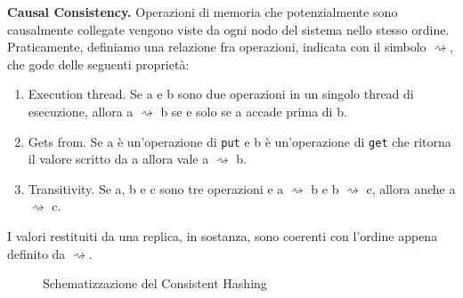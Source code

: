 \documentclass[twoside]{article}
\begin{document}
\begin{multicols}{2}
\textbf{Causal Consistency.} Operazioni di memoria che potenzialmente sono causalmente collegate vengono viste da ogni nodo del sistema nello stesso ordine. Praticamente, definiamo una relazione fra operazioni, indicata con il simbolo $\rightsquigarrow$, che gode delle seguenti proprietà:
\begin{enumerate}[topsep=0pt,itemsep=-1ex,partopsep=1ex,parsep=1ex]
\item Execution thread. Se a e b sono due operazioni in un singolo thread di esecuzione, allora a $\rightsquigarrow$ b se e solo se a accade prima di b.
\item Gets from. Se a è un'operazione di \texttt{put} e b è un'operazione di \texttt{get} che ritorna il valore scritto da a allora vale a $\rightsquigarrow$ b.
\item Transitivity. Se a, b e c sono tre operazioni e a $\rightsquigarrow$ b e b $\rightsquigarrow$ c, allora anche a $\rightsquigarrow$ c.
\end{enumerate}
I valori restituiti da una replica, in sostanza, sono coerenti con l'ordine appena definito da $\rightsquigarrow$.
\begin{figure}[H]
\centering
{}
\caption{Schematizzazione del Consistent Hashing}
\label{fig:consistent-hashing-ring}
\end{figure}


\end{multicols}
\end{document}
